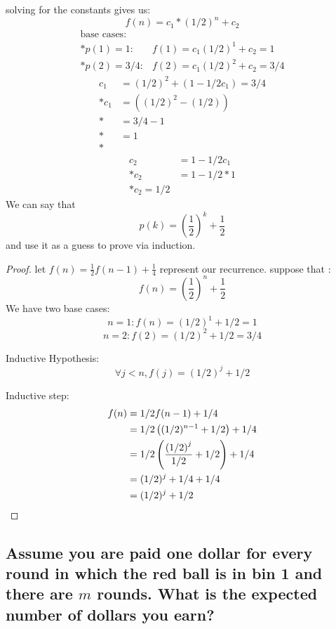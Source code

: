 \documentclass[titlepage]{article}\usepackage[]{graphicx}\usepackage[]{color}
\theoremstyle{definition}
\begin{document}
    solving for the constants gives us:
    \[ f(n) = c_1 * (1/2)^n + c_2 \]
    \begin{align}
      \text{base cases}: \\*
      p(1) = 1: & f(1) = c_1 (1/2)^1 + c_2 = 1  \\*
      p(2) = 3/4: & f(2) = c_1 (1/2)^2 + c_2 = 3/4
    \end{align}
    \begin{align}
      c_1 &= (1/2)^2 + (1 - 1/2 c_1) = 3/4 \\*
      c_1 &= \left( (1/2)^2 - (1/2)\right) \\*
          &= 3/4 - 1 \\*
          &= 1 \\*
    \end{align}
    \begin{align}
      c_2 &= 1 - 1/2 c_1 \\*
      c_2 &= 1 - 1/2 * 1 \\*
      c_2 = 1/2
    \end{align}
  We can say that 
  \[ p(k) = \left(\frac{1}{2}\right)^k + \frac{1}{2} \]
  and use it as a guess to prove via induction.
  \begin{proof}
      let $f(n) = \frac{1}{2} f(n-1) + \frac{1}{4}$ represent our recurrence. 
      suppose that :
    \[ f(n) = \left(\frac{1}{2}\right)^n + \frac{1}{2} \]
    We have two base cases:
    \[ n =1: f(n) = (1/2)^1 + 1/2 = 1 \]
    \[ n = 2: f(2) = (1/2)^2 + 1/2 = 3/4 \]

    Inductive Hypothesis:
    \[ \forall j < n, f(j) = (1/2)^j + 1/2 \]

    Inductive step:
    \begin{align}
      f(n) &= 1/2 f(n-1) + 1/4 \\*
      &= 1/2\left( (1/2)^{n-1} + 1/2 \right) + 1/4 \\*
      &= 1/2 \left( \frac{\left(1/2\right)^j}{1/2} + 1/2 \right) + 1/4 \\*
      &= (1/2)^j + 1/4 + 1/4 \\*
      &= (1/2)^j + 1/2 \qedhere
    \end{align}
  \end{proof}


\subsection{Assume you are paid one dollar for every round in which the red
	ball is in bin 1 and there are $m$ rounds. What is the expected number of
dollars you earn?}
\end{document}
